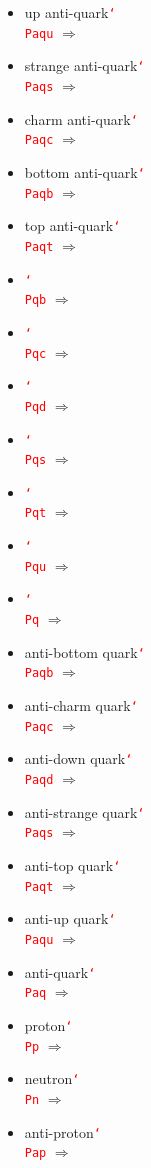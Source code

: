 \documentclass[12pt]{article}
\newcommand{\texcmd}[1]{\textcolor{red}{\texttt{\char`\\#1}}}
\begin{document}
\begin{multicols}{2}
{\begin{itemize}
\item up anti-quark\newline \texcmd{Paqu} $\Rightarrow$ \Paqu
\item strange anti-quark\newline \texcmd{Paqs} $\Rightarrow$ \Paqs
\item charm anti-quark\newline \texcmd{Paqc} $\Rightarrow$ \Paqc
\item bottom anti-quark\newline \texcmd{Paqb} $\Rightarrow$ \Paqb
\item top anti-quark\newline \texcmd{Paqt} $\Rightarrow$ \Paqt
\item  \texcmd{Pqb} $\Rightarrow$ \Pqb
\item  \texcmd{Pqc} $\Rightarrow$ \Pqc
\item  \texcmd{Pqd} $\Rightarrow$ \Pqd
\item  \texcmd{Pqs} $\Rightarrow$ \Pqs
\item  \texcmd{Pqt} $\Rightarrow$ \Pqt
\item  \texcmd{Pqu} $\Rightarrow$ \Pqu
\item  \texcmd{Pq} $\Rightarrow$ \Pq
\item anti-bottom quark\newline \texcmd{Paqb} $\Rightarrow$ \Paqb
\item anti-charm quark\newline \texcmd{Paqc} $\Rightarrow$ \Paqc
\item anti-down quark\newline \texcmd{Paqd} $\Rightarrow$ \Paqd
\item anti-strange quark\newline \texcmd{Paqs} $\Rightarrow$ \Paqs
\item anti-top quark\newline \texcmd{Paqt} $\Rightarrow$ \Paqt
\item anti-up quark\newline \texcmd{Paqu} $\Rightarrow$ \Paqu
\item anti-quark\newline \texcmd{Paq} $\Rightarrow$ \Paq
\item proton\newline \texcmd{Pp} $\Rightarrow$ \Pp
\item neutron\newline \texcmd{Pn} $\Rightarrow$ \Pn
\item anti-proton\newline \texcmd{Pap} $\Rightarrow$ \Pap

\end{itemize}}
\end{multicols}
\end{document}
